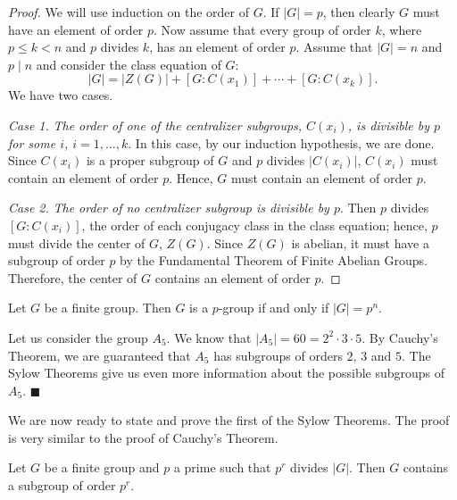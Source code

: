 \begin{proof}
We will use induction on the order of $G$.  If $|G|=p$, then clearly
$G$ must have an element of order $p$. Now assume that every group of
order $k$, where $p \leq k < n$ and $p$ divides $k$, has an element of
order $p$. Assume that $|G|= n$ and $p \mid n$ and consider the class
equation of $G$: 
$$
|G| = |Z(G)| + [G: C(x_1) ] + \cdots + [ G: C(x_k)].
$$
We have two cases.
 
 
{\em Case 1.}
{\em The order of one of the centralizer subgroups, $C(x_i)$, is
divisible by $p$ for some $i$, $i = 1, \ldots, k$}. 
In this case,  by our induction hypothesis, we are done. Since $C(x_i)$
is a proper subgroup of $G$ and $p$ divides $|C(x_i)|$, $C(x_i)$ must
contain an element of order $p$. Hence, $G$ must contain an element of
order $p$.  
 
 
{\em Case 2.}
{\em The order of no centralizer subgroup is divisible by
$p$}. 
Then $p$ divides $[G:C(x_i)]$, the order of each conjugacy class in
the class equation; hence, $p$ must divide the center of $G$, $Z(G)$.
Since $Z(G)$ is abelian, it must have a subgroup of order $p$ by the
Fundamental Theorem of Finite Abelian Groups. Therefore, the center of
$G$ contains an element of order $p$. 
\end{proof}
 
 
\begin{corollary}
Let $G$ be a finite group. Then $G$ is a $p$-group if and only if $|G|
= p^n$. 
\end{corollary}
 
 
Let us consider the group $A_5$.  We know that $|A_5| = 60 = 2^2 \cdot
3 \cdot 5$.  By Cauchy's Theorem, we are guaranteed that $A_5$ has
subgroups of orders $2$, $3$ and $5$. The Sylow Theorems give us even
more information about the possible subgroups of $A_5$.
\hspace{\fill} $\blacksquare$
 
 
\medskip
 
 
We are now ready to state and prove the first of the Sylow Theorems.
The proof is very similar to the proof of Cauchy's Theorem.
 
 
\begin{theorem}
Let $G$ be a finite group and $p$ a prime such that $p^r$ divides
$|G|$. Then $G$ contains a subgroup of order $p^r$. 
\end{theorem}
 

